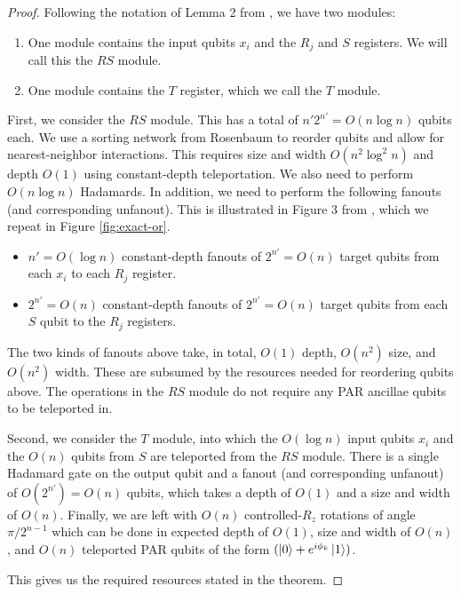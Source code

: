 \begin{proof}
Following the notation of Lemma 2 from \cite{Takahashi2011}, we have two
modules:

\begin{enumerate}
\item One module contains the input qubits $x_i$ and the $R_j$ and $S$
registers. We will call this the $RS$ module.
\item One module contains the $T$ register, which we call the $T$ module.
\end{enumerate}

First, we consider the $RS$ module.
This has a total of $n'2^{n'} = O(n\log n)$ qubits each.
We use a sorting network from Rosenbaum \cite{Rosenbaum2012} to
reorder qubits and allow for nearest-neighbor interactions.
This requires size and width $O(n^2\log^2 n)$ and depth $O(1)$
using constant-depth teleportation. We also need to perform $O(n\log n)$
Hadamards.
In addition, we need to
perform the following fanouts (and corresponding unfanout).
This is illustrated in Figure 3 from
\cite{Takahashi2011}, which we repeat in Figure \ref{fig:exact-or}.

\begin{itemize}
\item
$n' = O(\log n)$ constant-depth fanouts of $2^{n'} = O(n)$
target qubits from each $x_i$ to each $R_j$ register.
\item
$2^{n'} = O(n)$ constant-depth fanouts of $2^{n'} = O(n)$
target qubits from each $S$ qubit to the $R_j$ registers.
\end{itemize}

The two kinds of fanouts above take, in total, $O(1)$ depth, $O(n^2)$ size,
and $O(n^2)$ width. These are subsumed by the resources needed
for reordering qubits above. The operations in the $RS$ module
do not require any PAR ancillae qubits to be teleported in.

Second, we consider the $T$ module, into which the $O(\log n)$ input qubits
$x_i$ and the $O(n)$ qubits from $S$ are teleported from the $RS$ module.
There is a single
Hadamard gate on the output qubit and a fanout
(and corresponding unfanout) of $O(2^{n'}) = O(n)$ qubits,
which takes a depth of $O(1)$ and a size and width of $O(n)$.
Finally, we are left with $O(n)$ controlled-$R_z$ rotations of
angle $\pi / 2^{n-1}$ which can be done in expected depth of $O(1)$,
 size and width of $O(n)$, and $O(n)$ teleported PAR qubits
 of the form $(\left\vert{0}\right\rangle + e^{i\phi_k}\left\vert{1}\right\rangle)$.

 This gives us the required resources stated in the theorem.
\end{proof}

